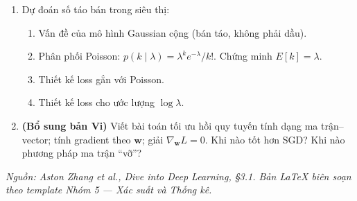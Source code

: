 \documentclass[12pt,a4paper]{article}
\begin{document}
\begin{enumerate}
  \item Dự đoán số táo bán trong siêu thị:
  \begin{enumerate}
    \item Vấn đề của mô hình Gaussian cộng (bán táo, không phải dầu).
    \item Phân phối Poisson: $p(k \mid \lambda) = \lambda^k e^{-\lambda}/k!$. Chứng minh $E[k] = \lambda$.
    \item Thiết kế loss gắn với Poisson.
    \item Thiết kế loss cho ước lượng $\log\lambda$.
  \end{enumerate}

  \item \textbf{(Bổ sung bản Vi)} Viết bài toán tối ưu hồi quy tuyến tính dạng ma trận--vector; tính gradient theo $\mathbf{w}$; giải $\nabla_{\mathbf{w}} L = 0$. Khi nào tốt hơn SGD? Khi nào phương pháp ma trận ``vỡ''?
\end{enumerate}

\vfill
\noindent\textit{Nguồn: Aston Zhang et al., \emph{Dive into Deep Learning}, §3.1. Bản LaTeX biên soạn theo template Nhóm 5 --- Xác suất và Thống kê.}
\end{document}
